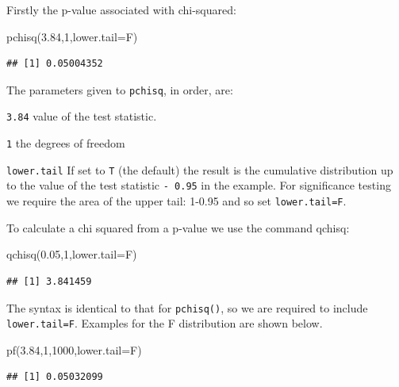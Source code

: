 \documentclass[
]{book}
\newenvironment{Shaded}{\begin{snugshade}}{\end{snugshade}}
\newcommand{\AttributeTok}[1]{\textcolor[rgb]{0.77,0.63,0.00}{#1}}
\newcommand{\DecValTok}[1]{\textcolor[rgb]{0.00,0.00,0.81}{#1}}
\newcommand{\FloatTok}[1]{\textcolor[rgb]{0.00,0.00,0.81}{#1}}
\newcommand{\FunctionTok}[1]{\textcolor[rgb]{0.00,0.00,0.00}{#1}}
\newcommand{\NormalTok}[1]{#1}
\begin{document}
Firstly the p-value associated with chi-squared:

\begin{Shaded}
\begin{Highlighting}[]
\FunctionTok{pchisq}\NormalTok{(}\FloatTok{3.84}\NormalTok{,}\DecValTok{1}\NormalTok{,}\AttributeTok{lower.tail=}\NormalTok{F)}
\end{Highlighting}
\end{Shaded}

\begin{verbatim}
## [1] 0.05004352
\end{verbatim}

The parameters given to \texttt{pchisq}, in order, are:

\texttt{3.84} value of the test statistic.

\texttt{1} the degrees of freedom

\texttt{lower.tail} If set to \texttt{T} (the default) the result is the cumulative distribution up to the value of the test statistic \texttt{-\ 0.95} in the example. For significance testing we require the area of the upper tail: 1-0.95 and so set \texttt{lower.tail=F}.

To calculate a chi squared from a p-value we use the command qchisq:

\begin{Shaded}
\begin{Highlighting}[]
\FunctionTok{qchisq}\NormalTok{(}\FloatTok{0.05}\NormalTok{,}\DecValTok{1}\NormalTok{,}\AttributeTok{lower.tail=}\NormalTok{F)}
\end{Highlighting}
\end{Shaded}

\begin{verbatim}
## [1] 3.841459
\end{verbatim}

The syntax is identical to that for \texttt{pchisq()}, so we are required to include \texttt{lower.tail=F}.
Examples for the F distribution are shown below.

\begin{Shaded}
\begin{Highlighting}[]
\FunctionTok{pf}\NormalTok{(}\FloatTok{3.84}\NormalTok{,}\DecValTok{1}\NormalTok{,}\DecValTok{1000}\NormalTok{,}\AttributeTok{lower.tail=}\NormalTok{F)}
\end{Highlighting}
\end{Shaded}

\begin{verbatim}
## [1] 0.05032099
\end{verbatim}
\end{document}
